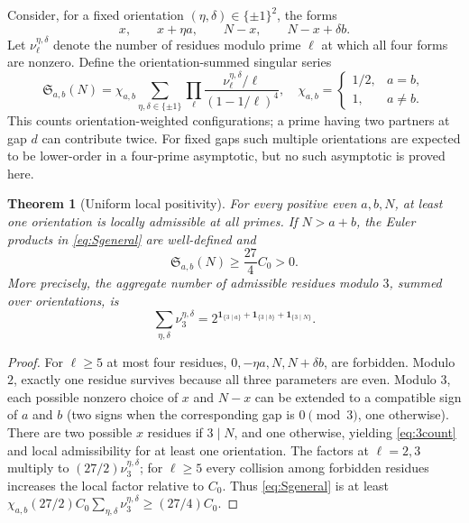 \documentclass[11pt,a4paper]{article}
\newtheorem{theorem}{Theorem}[section]
\theoremstyle{definition}
\theoremstyle{remark}
\newcommand{\ind}{\mathbf 1}
\newcommand{\sg}{\mathfrak S}
\begin{document}
Consider, for a fixed orientation $(\eta,\delta)\in\{\pm1\}^2$, the forms
\begin{equation}
 x,\qquad x+\eta a,\qquad N-x,\qquad N-x+\delta b.
\end{equation}
Let $\nu_\ell^{\eta,\delta}$ denote the number of residues modulo prime $\ell$ at which all four forms are nonzero. Define the orientation-summed singular series
\begin{equation}\label{eq:Sgeneral}
 \sg_{a,b}(N)=\chi_{a,b}\sum_{\eta,\delta\in\{\pm1\}}
 \prod_\ell\frac{\nu_\ell^{\eta,\delta}/\ell}{(1-1/\ell)^4},
 \quad \chi_{a,b}=\begin{cases}1/2,&a=b,\\1,&a\ne b.\end{cases}
\end{equation}
This counts orientation-weighted configurations; a prime having two partners at gap $d$ can contribute twice.  For fixed gaps such multiple orientations are expected to be lower-order in a four-prime asymptotic, but no such asymptotic is proved here.

\begin{theorem}[Uniform local positivity]\label{thm:positivity}
For every positive even $a,b,N$, at least one orientation is locally admissible at all primes.  If $N>a+b$, the Euler products in \eqref{eq:Sgeneral} are well-defined and
\begin{equation}\label{eq:lowerbound}
 \boxed{\displaystyle \sg_{a,b}(N)\ge\frac{27}{4}C_0>0.}
\end{equation}
More precisely, the aggregate number of admissible residues modulo $3$, summed over orientations, is
\begin{equation}\label{eq:3count}
 \sum_{\eta,\delta}\nu_3^{\eta,\delta}
 =2^{\ind_{\{3\mid a\}}+\ind_{\{3\mid b\}}+\ind_{\{3\mid N\}}}.
\end{equation}
\end{theorem}
\begin{proof}
For $\ell\ge5$ at most four residues, $0,-\eta a,N,N+\delta b$, are forbidden.  Modulo $2$, exactly one residue survives because all three parameters are even.  Modulo $3$, each possible nonzero choice of $x$ and $N-x$ can be extended to a compatible sign of $a$ and $b$ (two signs when the corresponding gap is $0\pmod3$, one otherwise).  There are two possible $x$ residues if $3\mid N$, and one otherwise, yielding \eqref{eq:3count} and local admissibility for at least one orientation.  The factors at $\ell=2,3$ multiply to $(27/2)\nu_3^{\eta,\delta}$; for $\ell\ge5$ every collision among forbidden residues increases the local factor relative to $C_0$. Thus \eqref{eq:Sgeneral} is at least $\chi_{a,b}(27/2)C_0\sum_{\eta,\delta}\nu_3^{\eta,\delta}\ge(27/4)C_0$.
\end{proof}
\end{document}
